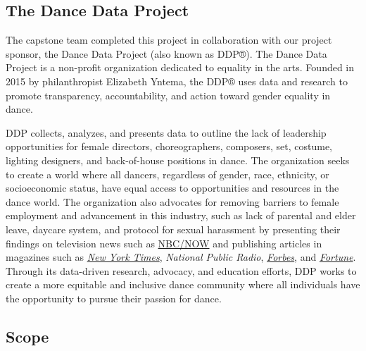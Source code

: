 \documentclass[Dance Data
Project,article,submit,moreauthors,pdftex]{mdpi}
\begin{document}
\hypertarget{the-dance-data-project}{%
\subsection{The Dance Data Project}\label{the-dance-data-project}}

The capstone team completed this project in collaboration with our
project sponsor, the Dance Data Project (also known as DDP®). The Dance
Data Project is a non-profit organization dedicated to equality in the
arts. Founded in 2015 by philanthropist Elizabeth Yntema, the DDP® uses
data and research to promote transparency, accountability, and action
toward gender equality in dance.

DDP collects, analyzes, and presents data to outline the lack of
leadership opportunities for female directors, choreographers,
composers, set, costume, lighting designers, and back-of-house positions
in dance. The organization seeks to create a world where all dancers,
regardless of gender, race, ethnicity, or socioeconomic status, have
equal access to opportunities and resources in the dance world. The
organization also advocates for removing barriers to female employment
and advancement in this industry, such as lack of parental and elder
leave, daycare system, and protocol for sexual harassment by presenting
their findings on television news such as
\href{https://www.youtube.com/watch?t=2532\&v=eWL_r5Gq2Vk\&feature=youtu.be}{NBC/NOW}
and publishing articles in magazines such as
\href{https://www.nytimes.com/2022/01/21/arts/dance/gender-gap-ballet.html}{\emph{New
York Times}}, \emph{National Public Radio},
\href{https://www.forbes.com/sites/kimelsesser/2019/09/12/a-gender-gap-in-ballet-seriously/?sh=7b9f066d2be6}{\emph{Forbes}},
and
\href{https://fortune.com/2022/01/25/board-diversity-cant-find-women-pipeline-problem/}{\emph{Fortune}}.
Through its data-driven research, advocacy, and education efforts, DDP
works to create a more equitable and inclusive dance community where all
individuals have the opportunity to pursue their passion for dance.

\hypertarget{scope}{%
\subsection{Scope}\label{scope}}
\end{document}
